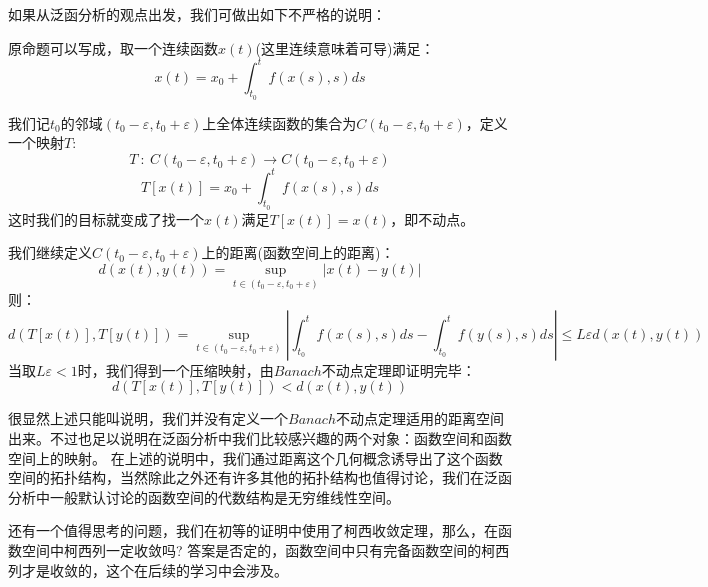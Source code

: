 如果从泛函分析的观点出发，我们可做出如下不严格的说明：

原命题可以写成，取一个连续函数$x(t)$(这里连续意味着可导)满足：
\[x(t)=x_0+\int_{t_0}^tf(x(s),s)ds\]

我们记$t_0$的邻域$(t_0-\varepsilon,t_0+\varepsilon)$上全体连续函数的集合为$C(t_0-\varepsilon,t_0+\varepsilon)$，定义一个映射$T$:
\[T \ : \ C(t_0-\varepsilon,t_0+\varepsilon) \rightarrow C(t_0-\varepsilon,t_0+\varepsilon)\]
\[T[x(t)]=x_0+\int_{t_0}^tf(x(s),s)ds\]
这时我们的目标就变成了找一个$x(t)$满足$T[x(t)]=x(t)$，即不动点。

我们继续定义$C(t_0-\varepsilon,t_0+\varepsilon)$上的距离(函数空间上的距离)：
\[d(x(t),y(t))={\mathop {\text{sup}}\limits_{t \in (t_0-\varepsilon,t_0+\varepsilon)}} |x(t)-y(t)|\]
则：
\[d(T[x(t)],T[y(t)])={\mathop {\text{sup}}\limits_{t \in (t_0-\varepsilon,t_0+\varepsilon)}} \left|\int_{t_0}^tf(x(s),s)ds-\int_{t_0}^tf(y(s),s)ds \right| \leq L\varepsilon d(x(t),y(t))\]
当取$L\varepsilon < 1$时，我们得到一个压缩映射，由$Banach$不动点定理即证明完毕：
\[d(T[x(t)],T[y(t)]) < d(x(t),y(t))\]

很显然上述只能叫说明，我们并没有定义一个$Banach$不动点定理适用的距离空间出来。不过也足以说明在泛函分析中我们比较感兴趣的两个对象：函数空间和函数空间上的映射。
在上述的说明中，我们通过距离这个几何概念诱导出了这个函数空间的拓扑结构，当然除此之外还有许多其他的拓扑结构也值得讨论，我们在泛函分析中一般默认讨论的函数空间的代数结构是无穷维线性空间。

还有一个值得思考的问题，我们在初等的证明中使用了柯西收敛定理，那么，在函数空间中柯西列一定收敛吗?
答案是否定的，函数空间中只有完备函数空间的柯西列才是收敛的，这个在后续的学习中会涉及。